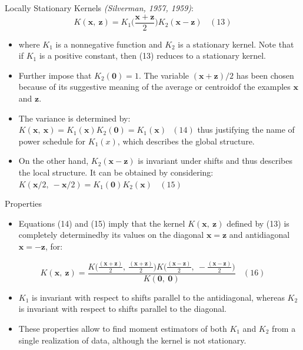 \documentclass[
  ignorenonframetext,
]{beamer}
\providecommand{\tightlist}{%
  \setlength{\itemsep}{0pt}\setlength{\parskip}{0pt}}
\begin{document}
\begin{frame}{Locally Stationary Kernels}
\protect\hypertarget{locally-stationary-kernels-1}{}
\emph{(Silverman, 1957, 1959)}: \[
K(\pmb x,\ \pmb z) = K_1 \Big(\frac {\pmb x + \pmb z} 2 \Big) K_2(\pmb x - \pmb z) \ \ \ \ (13)
\]

\begin{itemize}
\item
  where \(K_1\) is a nonnegative function and \(K_2\) is a stationary
  kernel. Note that if \(K_1\) is a positive constant, then (13) reduces
  to a stationary kernel.
\item
  Further impose that \(K_2(\pmb 0) = 1\). The variable
  \((\pmb x + \pmb z)/2\) has been chosen because of its suggestive
  meaning of the average or centroidof the examples \(\pmb x\) and
  \(\pmb z\).
\end{itemize}
\end{frame}

\begin{frame}{}
\protect\hypertarget{section-10}{}
\begin{itemize}
\item
  The variance is determined by:
  \(K(\pmb x,\ \pmb x) = K_1(\pmb x)K_2(\pmb 0) = K_1(\pmb x)\ \ \  (14)\)
  thus justifying the name of power schedule for \(K_1(x)\), which
  describes the global structure.
\item
  On the other hand, \(K_2(\pmb x-\pmb z)\) is invariant under shifts
  and thus describes the local structure. It can be obtained by
  considering:
  \(K(\pmb x/2,\ -\pmb x/2) = K_1(\pmb 0)K_2(\pmb x) \ \ \ \ (15)\)
\end{itemize}
\end{frame}

\begin{frame}{Properties}
\protect\hypertarget{properties}{}
\begin{itemize}
\tightlist
\item
  Equations (14) and (15) imply that the kernel \(K(\pmb x,\ \pmb z)\)
  defined by (13) is completely determinedby its values on the diagonal
  \(\pmb x = \pmb z\) and antidiagonal \(\pmb x = - \pmb z\), for:
\end{itemize}

\[
K(\pmb x,\ \pmb z) = \frac {K \big({\frac {(\pmb {x + z})} 2},\ {\frac {(\pmb {x + z})} 2}\big)K \big({\frac {(\pmb {x - z})} 2},\ -{\frac {(\pmb {x - z})} 2}\big)} {K(\pmb 0,\ \pmb 0)} \ \ \ \ (16)
\]

\begin{itemize}
\item
  \(K_1\) is invariant with respect to shifts parallel to the
  antidiagonal, whereas \(K_2\) is invariant with respect to shifts
  parallel to the diagonal.
\item
  These properties allow to find moment estimators of both \(K_1\) and
  \(K_2\) from a single realization of data, although the kernel is not
  stationary.
\end{itemize}
\end{frame}
\end{document}
